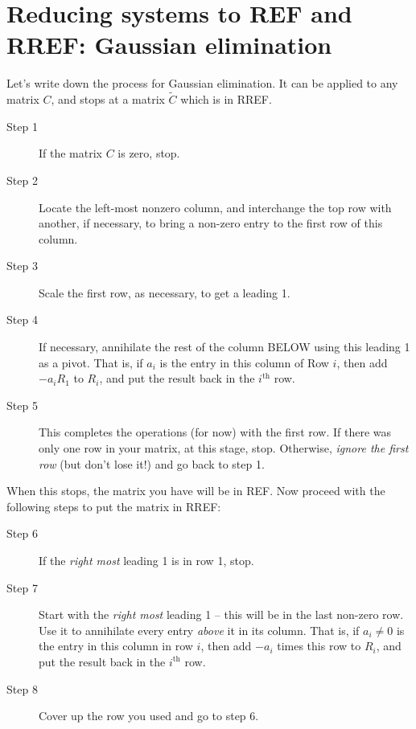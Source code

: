\section{Reducing systems to REF and RREF:  Gaussian elimination}

Let's write down the process for Gaussian elimination. It can be applied to any matrix $C$, and stops at a matrix $\tilde C$ which is in RREF.


\begin{description}
\item[Step 1] If the matrix $C$ is zero, stop.
\item[Step 2] Locate the left-most nonzero column, and interchange the top row with another, if necessary, to bring a non-zero entry to the first row of this column.
\item[Step 3] Scale the first row, as necessary, to get a leading 1.
\item[Step 4] If necessary, annihilate the rest of the column BELOW using this leading 1 as a pivot.  That is, if $a_i$ is the entry in this column of Row $i$, then add $-a_i R_1$ to $R_i$, and put the result back in the $i^{\text{th}}$ row.
\item[Step 5] This completes the operations (for now) with the first row. If there was only one row in your matrix, at this stage, stop. Otherwise, {\it ignore the first row} (but don't lose it!) and go back to step 1.
\end{description}
When this stops, the matrix you have will
be in REF. Now proceed with the following steps to
put the matrix in RREF:
\begin{description}
\item[Step 6] If the {\it right most} leading 1 is in row 1, stop.
\item[Step 7] Start with the {\it right most} leading 1 -- this will be in the last non-zero row.  Use it to annihilate every entry {\it above} it in its column. That is, if $a_i\not=0$ is the entry in this column in row $i$,
then add $-a_i$ times this row to $R_i$, and put the result back in the $i^{\text{th}}$ row. 
\item[Step 8]Cover up the row you used and go to step 6.
\end{description}


